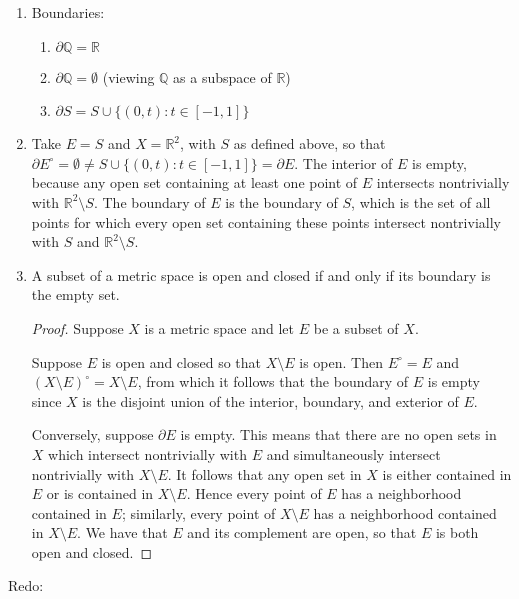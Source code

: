 \documentclass[12pt]{amsart}
\begin{document}
\begin{enumerate}
    \item Boundaries: \begin{enumerate}
        \item $\partial \mathbb{Q}  = \mathbb{R}$
        \item $\partial \mathbb{Q} = \emptyset$ (viewing $\mathbb{Q}$ as a subspace of $\mathbb{R}$)
        \item $\partial S = S\cup \{(0,t)\colon t\in [-1,1]\}$
    \end{enumerate}
    \item Take $E = S$ and $X = \mathbb{R}^2$, with $S$ as defined above, so that $\partial E^\circ = \emptyset \neq S\cup \{(0,t)\colon t\in [-1,1]\} = \partial E$. The interior of $E$ is empty, because any open set containing at least one point of $E$ intersects nontrivially with $\mathbb{R}^2\setminus S$. The boundary of $E$ is the boundary of $S$, which is the set of all points for which every open set containing these points intersect nontrivially with $S$ and $\mathbb{R}^2\setminus S$.
    \item A subset of a metric space is open and closed if and only if its boundary is the empty set. \begin{proof}
        Suppose $X$ is a metric space and let $E$ be a subset of $X$.

        Suppose $E$ is open and closed so that $X\setminus E$ is open. Then $E^\circ = E$ and $(X\setminus E)^\circ = X\setminus E$, from which it follows that the boundary of $E$ is empty since $X$ is the disjoint union of the interior, boundary, and exterior of $E$.

        Conversely, suppose $\partial E$ is empty. This means that there are no open sets in $X$ which intersect nontrivially with $E$ and simultaneously intersect nontrivially with $X\setminus E$. It follows that any open set in $X$ is either contained in $E$ or is contained in $X\setminus E$. Hence every point of $E$ has a neighborhood contained in $E$; similarly, every point of $X\setminus E$ has a neighborhood contained in $X\setminus E$. We have that $E$ and its complement are open, so that $E$ is both open and closed.
    \end{proof} 
\end{enumerate}
\newpage
Redo:
\end{document}
